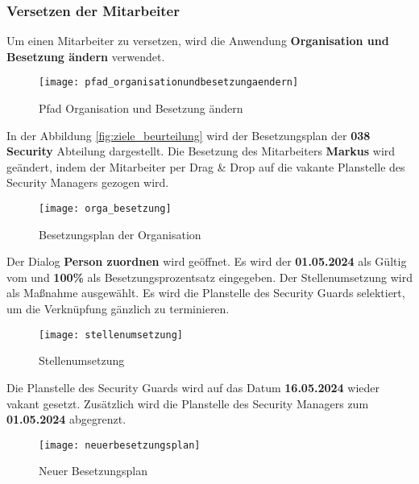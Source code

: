 \subsubsection{Versetzen der Mitarbeiter}
Um einen Mitarbeiter zu versetzen, wird die Anwendung \textbf{Organisation und Besetzung ändern} verwendet.
\begin{figure}[H]
	\centering
	\texttt{[image: pfad\_organisationundbesetzungaendern]}
	\caption{Pfad Organisation und Besetzung ändern}
	\label{fig:pfad_organisationundbesetzungaendern}
\end{figure}
In der Abbildung \ref{fig:ziele_beurteilung} wird der Besetzungsplan der \textbf{038 Security} Abteilung dargestellt. Die Besetzung des Mitarbeiters \textbf{Markus} wird geändert, indem der Mitarbeiter per Drag \& Drop auf die vakante Planstelle des Security Managers gezogen wird.
\begin{figure}[H]
	\centering
	\texttt{[image: orga\_besetzung]}
	\caption{Besetzungsplan der Organisation}
	\label{fig:orga_besetzung}
\end{figure}
Der Dialog \textbf{Person zuordnen} wird geöffnet. Es wird der \textbf{01.05.2024} als Gültig vom und \textbf{100\%} als Besetzungsprozentsatz eingegeben. Der Stellenumsetzung wird als Maßnahme ausgewählt. Es wird die Planstelle des Security Guards selektiert, um die Verknüpfung gänzlich zu terminieren.
\begin{figure}[H]
	\centering
	\texttt{[image: stellenumsetzung]}
	\caption{Stellenumsetzung}
	\label{fig:stellenumsetzung}
\end{figure}
Die Planstelle des Security Guards wird auf das Datum \textbf{16.05.2024} wieder vakant gesetzt. Zusätzlich wird die Planstelle des Security Managers zum \textbf{01.05.2024} abgegrenzt.
\begin{figure}[H]
	\centering
	\texttt{[image: neuerbesetzungsplan]}
	\caption{Neuer Besetzungsplan}
	\label{fig:neuerbesetzungsplan}
\end{figure}
\clearpage
